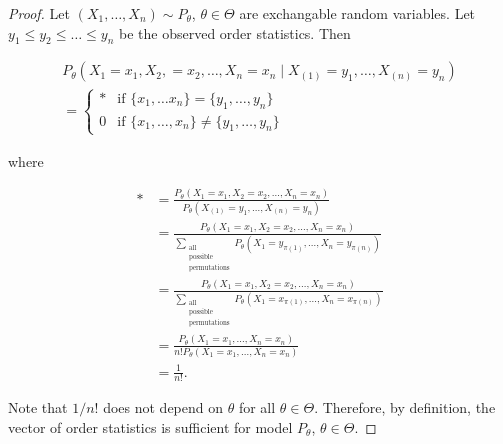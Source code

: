 \documentclass[12pt]{article}
\theoremstyle{definition}
\begin{document}
\begin{proof}
Let $(X_1, \ldots, X_n) \sim P_{\theta}$, $\theta \in \Theta$ are
exchangable random variables. Let $y_1 \leq y_2 \leq \ldots \leq y_n$ 
be the observed order statistics. Then

\begin{align*}
P_{\theta}(X_1 = x_1, X_2, = x_2, \ldots, X_n = x_n \mid X_{(1)} = y_1, \ldots, X_{(n)} = y_n) \\
= \begin{cases}
* & \text{if } \{x_1, \ldots x_n \} = \{y_1, \ldots, y_n \} \\
0 & \text{if } \{x_1, \ldots, x_n \} \neq \{y_1, \ldots, y_n \}
\end{cases}
\end{align*}

where

\begin{align*}
* &= \frac{P_{\theta}(X_1 = x_1, X_2 = x_2, \ldots, X_n = x_n)}
{P_{\theta}(X_{(1)} = y_1, \ldots, X_{(n)} = y_n)} \\
&= \frac{P_{\theta}(X_1 = x_1, X_2 = x_2, \ldots, X_n = x_n)}
{\sum\limits_{\substack{ \text{all} \\ \text{possible} \\ \text{permutations}}} 
P_{\theta}(X_1 = y_{\pi(1)}, \ldots, X_n = y_{\pi (n)})} \\
&= \frac{P_{\theta}(X_1 = x_1, X_2 = x_2, \ldots, X_n = x_n)}
{\sum\limits_{\substack{ \text{all} \\ \text{possible} \\ \text{permutations}}} 
P_{\theta}(X_1 = x_{\pi(1)}, \ldots, X_n = x_{\pi (n)})} \\
&= \frac{P_{\theta}(X_1 = x_1, \ldots, X_n = x_n)}
{n! P_{\theta}(X_1 = x_1, \ldots, X_n = x_n)} \\
&= \frac{1}{n!}.
\end{align*}


Note that $1/n!$ does not depend on $\theta$ for all $\theta \in \Theta$. Therefore,
by definition, the vector of order statistics is sufficient for model
$P_{\theta}$, $\theta \in \Theta$.
\end{proof}
\end{document}
